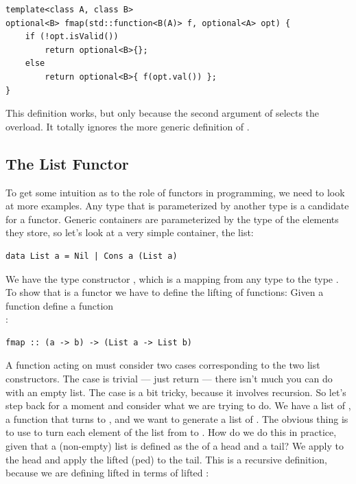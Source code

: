 \begin{Verbatim}
template<class A, class B>
optional<B> fmap(std::function<B(A)> f, optional<A> opt) { 
    if (!opt.isValid()) 
        return optional<B>{}; 
    else
        return optional<B>{ f(opt.val()) };
}
\end{Verbatim}
This definition works, but only because the second argument of
 selects the overload. It totally ignores the more generic
definition of .

\subsection{The List Functor}\label{the-list-functor}

To get some intuition as to the role of functors in programming, we need
to look at more examples. Any type that is parameterized by another type
is a candidate for a functor. Generic containers are parameterized by
the type of the elements they store, so let's look at a very simple
container, the list:

\begin{Verbatim}[commandchars=\\\{\}]
data List a = Nil | Cons a (List a)
\end{Verbatim}
We have the type constructor , which is a mapping from any
type  to the type . To show that 
is a functor we have to define the lifting of functions: Given a
function  define a function\\
:

\begin{Verbatim}[commandchars=\\\{\}]
fmap :: (a -> b) -> (List a -> List b)
\end{Verbatim}
A function acting on  must consider two cases
corresponding to the two list constructors. The  case is
trivial --- just return  --- there isn't much you can do
with an empty list. The  case is a bit tricky, because it
involves recursion. So let's step back for a moment and consider what we
are trying to do. We have a list of , a function 
that turns  to , and we want to generate a list of
. The obvious thing is to use  to turn each element
of the list from  to . How do we do this in
practice, given that a (non-empty) list is defined as the 
of a head and a tail? We apply  to the head and apply the
lifted (ped)  to the tail. This is a recursive
definition, because we are defining lifted  in terms of lifted
:

